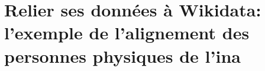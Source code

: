 \chapter{\label{II-C}Relier ses données à Wikidata: l'exemple de l'alignement des personnes physiques de l'\ac{ina}}

